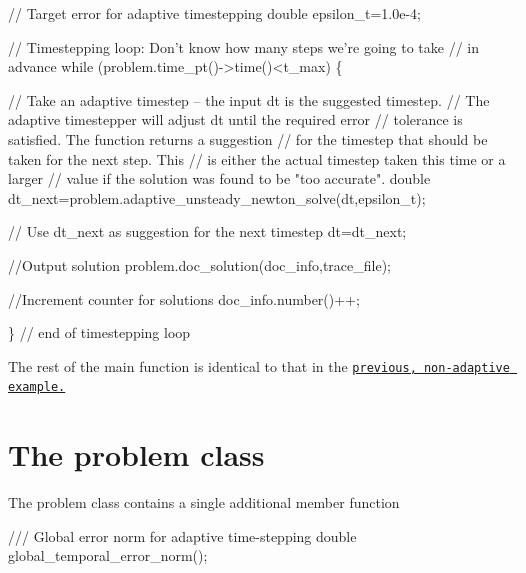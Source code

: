  
\begin{DoxyCodeInclude}
 \textcolor{comment}{// Target error for adaptive timestepping}
 \textcolor{keywordtype}{double} epsilon\_t=1.0e-4;

 \textcolor{comment}{// Timestepping loop: Don't know how many steps we're going to take}
 \textcolor{comment}{// in advance}
 \textcolor{keywordflow}{while} (problem.time\_pt()->time()<t\_max)
  \{
  
   \textcolor{comment}{// Take an adaptive timestep -- the input dt is the suggested timestep.}
   \textcolor{comment}{// The adaptive timestepper will adjust dt until the required error}
   \textcolor{comment}{// tolerance is satisfied. The function returns a suggestion}
   \textcolor{comment}{// for the timestep that should be taken for the next step. This}
   \textcolor{comment}{// is either the actual timestep taken this time or a larger}
   \textcolor{comment}{// value if the solution was found to be "too accurate". }
   \textcolor{keywordtype}{double} dt\_next=problem.adaptive\_unsteady\_newton\_solve(dt,epsilon\_t);

   \textcolor{comment}{// Use dt\_next as suggestion for the next timestep}
   dt=dt\_next;
 
   \textcolor{comment}{//Output solution}
   problem.doc\_solution(doc\_info,trace\_file);
   
   \textcolor{comment}{//Increment counter for solutions }
   doc\_info.number()++;

  \} \textcolor{comment}{// end of timestepping loop}

\end{DoxyCodeInclude}


The rest of the main function is identical to that in the \href{../../two_d_unsteady_heat/html/index.html}{\tt previous, non-\/adaptive example.}



 

\hypertarget{index_problem}{}\section{The problem class}\label{index_problem}
The problem class contains a single additional member function

 
\begin{DoxyCodeInclude}
 \textcolor{comment}{/// Global error norm for adaptive time-stepping}
 \textcolor{keywordtype}{double} global\_temporal\_error\_norm();

\end{DoxyCodeInclude}


